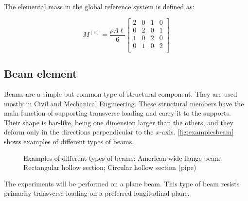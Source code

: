 The elemental mass in the global reference system is defined as:

\begin{equation}
    M^{(e)} = \dfrac{\rho A \ell}{6} \begin{bmatrix} 2 & 0 & 1 & 0 \\ 0 & 2 & 0 & 1 \\ 1 & 0 & 2 & 0 \\ 0 & 1 & 0 & 2\\ \end{bmatrix}
\end{equation}

\subsection{Beam element}
\label{sec:beam}

Beams are a simple but common type of structural component. They are used mostly in Civil and Mechanical Engineering. These structural members have the main function of supporting transverse loading and carry it to the supports. Their shape is bar-like, being one dimension larger than the others, and they deform only in the directions perpendicular to the $x$-axis. \autoref{fig:examplesbeam} shows examples of different types of beams.

\begin{figure}[H]%
\centering
\caption[INPE satellites]{Examples of different types of beams:
 American wide flange beam;
 Rectangular hollow section;
 Circular hollow section (pipe)}%
\label{fig:examplesbeam}%
\vspace{1em}
%
%
%
\end{figure}
 
The experiments will be performed on a plane beam. This type of beam resists primarily transverse loading on a preferred longitudinal plane.

